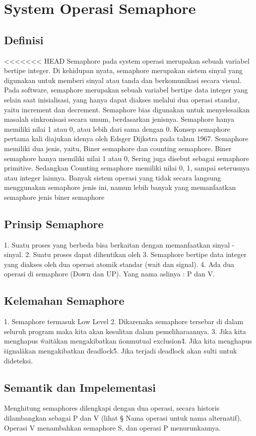 \section{System Operasi Semaphore}
\subsection{Definisi}
<<<<<<< HEAD
Semaphore pada system operasi merupakan sebuah variabel bertipe integer. Di kehidupan nyata, semaphore merupakan sistem sinyal yang
digunakan untuk memberi sinyal atau tanda dan berkomunikasi secara visual. Pada software, semaphore merupakan sebuah variabel bertipe data
integer yang selain saat inisialisasi, yang hanya dapat diakses melalui dua operasi standar, yaitu increment dan decrement. Semaphore bias
digunakan untuk menyelesaikan masalah sinkronisasi secara umum, berdasarkan jenisnya. Semaphore hanya memiliki nilai 1 atau 0, atau lebih
dari sama dengan 0. Konsep semaphore pertama kali diajukan idenya oleh Edsger Dijkstra pada tahun 1967. Semaphore memiliki dua jenis,
yaitu, Biner semaphore dan counting semaphore. Biner semaphore hanya memiliki nilai 1 atau 0, Sering juga disebut sebagai semaphore
primitive. Sedangkan Counting semaphore memiliki nilai 0, 1, sampai seterusnya atau integer lainnya. Banyak sistem operasi yang tidak
secara langsung menggunakan semaphore jenis ini, namun lebih banyak yang memanfaatkan semaphore jenis biner semaphore

\subsection{Prinsip Semaphore}
1. Suatu proses yang berbeda bisa berkaitan dengan memanfaatkan sinyal - sinyal.
2. Suatu proses dapat dihentikan oleh 
3. Semaphore bertipe data integer yang diakses oleh dua operasi atomik standar (wait dan signal).
4. Ada dua operasi di semaphore (Down dan UP). Yang nama aslinya : P dan V.

\subsection{Kelemahan Semaphore}
1. Semaphore termasuk Low Level
2. Dikarenaka semaphore tersebar di dalam seluruh program maka kita akan kesulitan dalam pemeliharaannya.
3. Jika kita menghapus \"wait\" akan mengakibatkan \"nonmutual exclusion\"
4. Jika kita menghapus \"signal\" akan mengakibatkan \"deadlock\"
5. Jika terjadi deadlock akan sulti untuk dideteksi.

\subsection{Semantik dan Impelementasi}
Menghitung semaphores dilengkapi dengan dua operasi, secara historis dilambangkan sebagai P dan V (lihat § Nama operasi untuk nama alternatif). Operasi V 
menambahkan semaphore S, dan operasi P menurunkannya.

